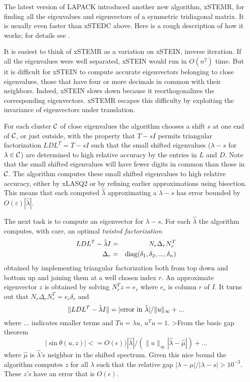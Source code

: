 The latest version of LAPACK introduced another new algorithm, xSTEMR,
for finding all the eigenvalues and eigenvectors of a symmetric
tridiagonal matrix.
It is usually even faster
than xSTEDC
above.
Here is a rough description of how it works; for
details see
\cite{holygrail,parlettdhillon00,parlettmarques00,dhillonparlett03}.

It is easiest to think of xSTEMR as a variation on xSTEIN,
inverse iteration.
If all the eigenvalues were well separated, xSTEIN would
run in $O(n^2)$ time.
But it is difficult for xSTEIN to compute accurate eigenvectors
belonging to close eigenvalues, those that have four or
more decimals in common with their neighbors. Indeed, xSTEIN
slows down because it reorthogonalizes the corresponding eigenvectors.
xSTEMR escapes this difficulty by exploiting the invariance of
eigenvectors under translation.

For each cluster $\cal C$ of close eigenvalues the algorithm chooses
a shift $s$ at one end of $\cal C$, or just outside, with the property
that $T - sI$ permits triangular factorization $LDL^T = T - sI$
such that the small shifted eigenvalues
($\lambda - s$ for $\lambda \in {\cal C}$)
are determined to high relative accuracy by the
entries in $L$ and $D$.  Note that the small shifted eigenvalues
will have fewer digits in common than those in $\cal C$.  The algorithm
computes these small shifted eigenvalues to high relative
accuracy, either by xLASQ2
or by refining earlier approximations
using bisection.  This means that each computed $\hat{\lambda}$
approximating a $\lambda - s$ has error bounded by $O( \varepsilon )
|\hat{\lambda}|$.

The next task is to compute an eigenvector for $\lambda - s$.  For each
$\hat{\lambda}$ the algorithm computes, with care, an optimal
{\em twisted factorization}
\begin{eqnarray*}
      LDL^T - \hat{\lambda} I &=& N_r \Delta_r N_r^T \\
         \Delta_r             &=& {\rm diag}(\delta_1,\delta_2, ...
,\delta_n)
\end{eqnarray*}
obtained by implementing triangular factorization both from top
down and bottom up and joining them at a well chosen index $r$.
An approximate eigenvector $z$ is obtained by solving $N_r^T z = e_r$
where $e_r$ is column $r$ of $I$.  It turns out that
$N_r \Delta_r N_r^T = e_r \delta_r$ and
\[
    \| LDL^T - \hat{\lambda} I \| =
     | {\rm error\ in\ } \hat{\lambda}| / \|u\|_{\infty} + ...
\]
where ... indicates smaller terms and $Tu = \lambda u$, $u^Tu = 1$.
>From the basic gap theorem \cite{parlett}
\[
   |\sin \theta(u,z)| <= O(\epsilon)
) |\hat{\lambda}| / (\|u\|_{\infty}
|\hat{\lambda} - \hat{\mu}| ) + ...
\]
where $\hat{\mu}$ is $\hat{\lambda}$'s neighbor in the shifted spectrum.
Given
this nice bound the algorithm computes $z$ for all $\lambda$ such that the
relative gap $|\lambda - \mu|/|\lambda - s| > 10^{-3}$.  These $z$'s have an
error
that is $O(\epsilon)$.

